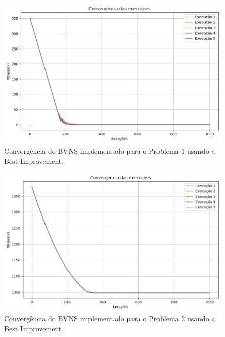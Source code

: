 \documentclass[
	12pt,				%
	oneside,			%
	a4paper,			%
	chapter=TITLE,
	sumario=tradicional,
	english,			%
	brazil				%
]{abntex2}
\begin{document}
\begin{figure}[h!]
	\caption{\label{fig:bestImprovement_p1}Convergência do BVNS implementado para o Problema 1 usando a Best Improvement.}
	\begin{center}
    \includegraphics[width=\textwidth,trim=1 1 1 1,clip]{bestImprovement_p1.png}
	\end{center}
\end{figure}

\begin{figure}[h!]
	\caption{\label{fig:bestImprovement_p2}Convergência do BVNS implementado para o Problema 2 usando a Best Improvement.}
	\begin{center}
    \includegraphics[width=\textwidth,trim=1 1 1 1,clip]{bestImprovement_p2.png}
	\end{center}
\end{figure}
\end{document}
